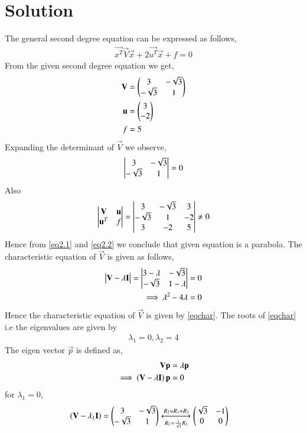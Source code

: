 \documentclass[journal,12pt,twocolumn]{IEEEtran}
\begin{document}
\section{Solution}
The general second degree equation can be expressed as follows,
\begin{align}
\vec{x^T}\vec{V}\vec{x}+2\vec{u^T}\vec{x}+f=0\label{eqmain}
\end{align}
From the given second degree equation we get,
\begin{align}
\mathbf{V} &= \begin{pmatrix}3&-\sqrt{3}\\-\sqrt{3}&1\end{pmatrix}\\ \label{given1}
\mathbf{u} &= \begin{pmatrix}3\\-2\end{pmatrix}\\ 
f &= 5 \label{given2}
\end{align}
Expanding the determinant of $\vec{V}$ we observe, 
\begin{align}
\begin{vmatrix}3&-\sqrt{3}\\-\sqrt{3}&1\end{vmatrix} = 0 \label{eq2.1}
\end{align}
Also
\begin{align}
    \begin{vmatrix}\mathbf{V}&\mathbf{u} \\\mathbf{u}^T & f\end{vmatrix}=
    \begin{vmatrix}3&-\sqrt{3}&3\\-\sqrt{3}&1 &-2\\3 &-2&5\end{vmatrix}
    \neq 0\label{eq2.2}\end{align}
Hence from \eqref{eq2.1} and \eqref{eq2.2} we conclude that given equation is a parabola. The characteristic equation of $\vec{V}$ is given as follows,
\begin{align}
\begin{vmatrix}\mathbf{V}-\lambda\mathbf{I}\end{vmatrix} = \begin{vmatrix}3-\lambda &-\sqrt{3}\\-\sqrt{3}& 1-\lambda\end{vmatrix} &= 0\\
\implies \lambda^2-4\lambda &= 0\label{eqchar}
\end{align}
Hence the characteristic equation of $\vec{V}$ is given by \eqref{eqchar}. The roots of \eqref{eqchar} i.e the eigenvalues are given by
\begin{align}
\lambda_1=0, \lambda_2=4\label{eqeigenvals}    
\end{align}
The eigen vector $\vec{p}$ is defined as, 
\begin{align}
\mathbf{V}\mathbf{p} &= \lambda\mathbf{p}\\
\implies\left(\mathbf{V}-\lambda\mathbf{I}\right)\mathbf{p}&=0 \label{eqev}
\end{align}
for $\lambda_1=0$,
\begin{align}
\left(\mathbf{V}-\lambda_1\mathbf{I}\right)&=\begin{pmatrix}3&-\sqrt{3}\\-\sqrt{3}&1\end{pmatrix}\xleftrightarrow[R_1=\frac{1}{\sqrt{3}}R_1]{R_2=R_1+R_2}\begin{pmatrix}\sqrt{3}&-1\\0&0\end{pmatrix}\label{eq2.3.0}
\end{align}
\end{document}
